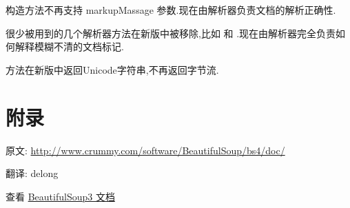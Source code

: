 \documentclass[letterpaper,12pt,english]{sphinxmanual}
\begin{document}
 构造方法不再支持 markupMassage 参数.现在由解析器负责文档的解析正确性.

很少被用到的几个解析器方法在新版中被移除,比如  和  .现在由解析器完全负责如何解释模糊不清的文档标记.

 方法在新版中返回Unicode字符串,不再返回字节流.


\chapter{附录}
\label{index:id82}\label{index:id35}\label{index:id83}\label{index:css}\label{index:attrs}\label{index:recursive}\label{index:id84}\label{index:id36}\label{index:id85}\label{index:keyword}\label{index:kwargs}\label{index:next-siblings-previous-siblings}\label{index:next-siblings}\label{index:next-siblings-previous-siblings}\label{index:previous-siblings}\label{index:next-elements-previous-elements}\label{index:next-elements}\label{index:next-elements-previous-elements}\label{index:previous-elements}\label{index:strings-stripped-strings}\label{index:stripped-strings}\label{index:id12}\label{index:id86}\label{index:id12}\label{index:lxmlhtml5lib}\label{index:unicode-dammit}\label{index:id87}\label{index:string}\label{index:tag-string}
原文: \url{http://www.crummy.com/software/BeautifulSoup/bs4/doc/}

翻译: delong

查看 \href{http://www.crummy.com/software/BeautifulSoup/bs3/documentation.zh.html}{BeautifulSoup3 文档}



\renewcommand{\indexname}{索引}
\printindex
\end{document}
